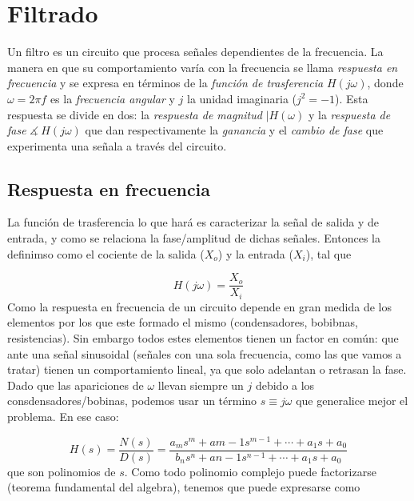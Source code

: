 \documentclass[12pt,a4paper]{article}
\numberwithin{equation}{section}
\numberwithin{figure}{section}
\begin{document}
\newpage

\section{Filtrado}

Un filtro es un circuito que procesa señales dependientes de la frecuencia. La manera en que su comportamiento varía con la frecuencia se llama \textit{respuesta en frecuencia} y se expresa en términos de la \textit{función de trasferencia} $H(j\omega)$, donde $\omega = 2 \pi f$ es la \textit{frecuencia angular} y $j$ la unidad imaginaria ($j^2 = -1$). Esta respuesta se divide en dos: la \textit{respuesta de magnitud} $|H(\omega)$ y la \textit{respuesta de fase} $\measuredangle \ H(j \omega)$ que dan respectivamente la \textit{ganancia} y el \textit{cambio de fase} que experimenta una señala a través del circuito.

\subsection{Respuesta en frecuencia}

La función de trasferencia lo que hará es caracterizar la señal de salida y de entrada, y como se relaciona la fase/amplitud de dichas señales. Entonces la definimso como el cociente de la salida ($X_o$) y la entrada ($X_i$), tal que

\begin{equation}
H(j \omega) = \dfrac{X_o}{X_i}
\end{equation}
Como la respuesta en frecuencia de un circuito depende en gran medida de los elementos por los que este formado el mismo (condensadores,  bobibnas, resistencias). Sin embargo todos estes elementos tienen un factor en común: que ante una señal sinusoidal (señales con una sola frecuencia, como las que vamos a tratar) tienen un comportamiento lineal, ya que solo adelantan o retrasan la fase. Dado que las apariciones de $\omega$ llevan siempre un $j$ debido a los consdensadores/bobinas, podemos usar un término $s \equiv j \omega$ que generalice mejor el problema. En ese caso:

\begin{equation}
H(s) = \dfrac{N(s)}{D(s)} = \dfrac{a_m s^m + a{m-1} s^{m-1} + \cdots + a_1 s + a_0}{b_n s^n + a{n-1} s^{n-1} + \cdots + a_1 s + a_0}
\end{equation}
que son polinomios de $s$. Como todo polinomio complejo puede factorizarse (teorema fundamental del algebra), tenemos que puede expresarse como
\end{document}

